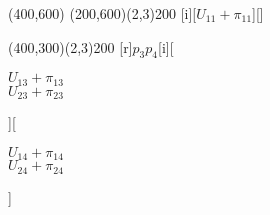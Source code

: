 \documentclass[11pt]{article}
\begin{document}
\newcommand{\pb}[1]{\parbox{1in}{\centering #1}}
\newcommand{\E}{\mathsf{E}}

\begin{center}
\begin{egame}(400,600)
  \putbranch(200,600)(2,3){200}
  [i][$U_{11} + \pi_{11}$][]

  \putbranch(400,300)(2,3){200}
  [r]{$p_3$}{$p_4$}[i][\pb{$U_{13} + \pi_{13}$ \\ $U_{23} +
    \pi_{23}$}][\pb{$U_{14} + \pi_{14}$ \\ $U_{24} + \pi_{24}$}]
\end{egame}
\end{center}


  



  



  
\end{document}
